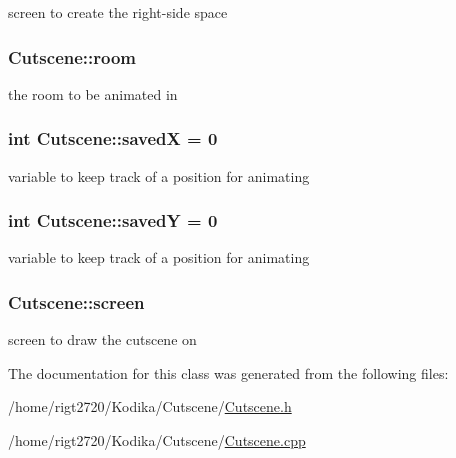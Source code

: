 screen to create the right-\/side space 

\hypertarget{classCutscene_a033c0715f32be9730d3692e57fe17096}{
\subsubsection[{room}]{ Cutscene\-::room\hspace{0.3cm}{\ttfamily [private]}}}\label{classCutscene_a033c0715f32be9730d3692e57fe17096}


the room to be animated in 

\hypertarget{classCutscene_a1d5c331a4d60a28f84eaa987f2a2fb4f}{
\subsubsection[{saved\-X}]{\setlength{\rightskip}{0pt plus 5cm}int Cutscene\-::saved\-X = 0\hspace{0.3cm}{\ttfamily [private]}}}\label{classCutscene_a1d5c331a4d60a28f84eaa987f2a2fb4f}


variable to keep track of a position for animating 

\hypertarget{classCutscene_af8166fd7fdf29fe8f86cadd29363fd78}{
\subsubsection[{saved\-Y}]{\setlength{\rightskip}{0pt plus 5cm}int Cutscene\-::saved\-Y = 0\hspace{0.3cm}{\ttfamily [private]}}}\label{classCutscene_af8166fd7fdf29fe8f86cadd29363fd78}


variable to keep track of a position for animating 

\hypertarget{classCutscene_a70df90fafe45f9a661d9e05ac4dd2a22}{
\subsubsection[{screen}]{ Cutscene\-::screen\hspace{0.3cm}{\ttfamily [private]}}}\label{classCutscene_a70df90fafe45f9a661d9e05ac4dd2a22}


screen to draw the cutscene on 



The documentation for this class was generated from the following files\-:\begin{DoxyCompactItemize}
\item 
/home/rigt2720/\-Kodika/\-Cutscene/\hyperlink{Cutscene_8h}{Cutscene.\-h}\item 
/home/rigt2720/\-Kodika/\-Cutscene/\hyperlink{Cutscene_8cpp}{Cutscene.\-cpp}\end{DoxyCompactItemize}
